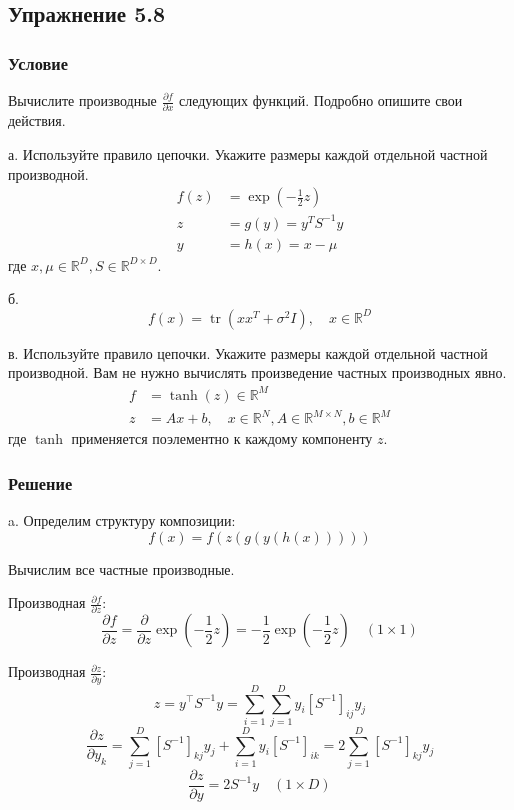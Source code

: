 \documentclass{article}
\begin{document}
\subsection*{Упражнение 5.8}

\subsubsection*{Условие}

Вычислите производные \( \frac{\partial f}{\partial x} \) следующих функций. Подробно опишите свои действия.

\quad

а. Используйте правило цепочки. Укажите размеры каждой отдельной частной производной.
\begin{align*}
f(z) &= \exp\left(-\frac{1}{2}z\right) \\
z &= g(y) = y^T S^{-1} y \\
y &= h(x) = x - \mu
\end{align*}
где \( x, \mu \in \mathbb{R}^D, S \in \mathbb{R}^{D \times D} \).

\quad

б.
\[
f(x) = \operatorname{tr}(xx^T + \sigma^2 I), \quad x \in \mathbb{R}^D
\]

\quad

в. Используйте правило цепочки. Укажите размеры каждой отдельной частной производной. Вам не нужно вычислять произведение частных производных явно.
\begin{align*}
f &= \tanh(z) \in \mathbb{R}^M \\
z &= Ax + b, \quad x \in \mathbb{R}^N, A \in \mathbb{R}^{M \times N}, b \in \mathbb{R}^M
\end{align*}
где \(\tanh\) применяется поэлементно к каждому компоненту \(z\).

\subsubsection*{Решение}

a. Определим структуру композиции:
\[
f(x) = f(z(g(y(h(x)))))
\]

Вычислим все частные производные.

\quad

Производная \( \frac{\partial f}{\partial z} \):
\[
\frac{\partial f}{\partial z} = \frac{\partial}{\partial z} \exp\left(-\frac{1}{2}z\right) = -\frac{1}{2} \exp\left(-\frac{1}{2}z\right) \quad (1 \times 1)
\]

Производная \( \frac{\partial z}{\partial y} \):
\[
z = y^\top S^{-1} y = \sum_{i=1}^D \sum_{j=1}^D y_i [S^{-1}]_{ij} y_j
\]
\[
\frac{\partial z}{\partial y_k} = \sum_{j=1}^D [S^{-1}]_{kj} y_j + \sum_{i=1}^D y_i [S^{-1}]_{ik} = 2 \sum_{j=1}^D [S^{-1}]_{kj} y_j
\]
\[
\frac{\partial z}{\partial y} = 2 S^{-1} y \quad (1 \times D)
\]
\end{document}
